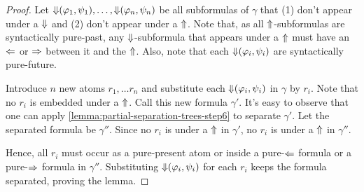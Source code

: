 \documentclass[a4paper,UKenglish,cleveref, autoref, thm-restate, numberwithinsect]{lipics-v2021}
\def\Larrow{\ensuremath\mathord{\Leftarrow}}
\def\Rarrow{\ensuremath\mathord{\Rightarrow}}
\def\Uarrow{\ensuremath\mathord{\Uparrow}}
\def\Darrow{\ensuremath\mathord{\Downarrow}}
\begin{document}
\begin{proof}
    Let $\Darrow(\varphi_1, \psi_1), \ldots, \Darrow(\varphi_n, \psi_n)$ be all subformulas of $\gamma$ that (1) don't appear under a $\Darrow$ and (2) don't appear under a $\Uarrow$. Note that, as all $\Uarrow$-subformulas are syntactically pure-past, any $\Darrow$-subformula that appears under a $\Uarrow$ must have an $\Larrow$ or $\Rarrow$ between it and the $\Uarrow$. Also, note that each $\Darrow(\varphi_i, \psi_i)$ are syntactically pure-future. %

    Introduce $n$ new atoms $r_1, \ldots r_n$ and substitute each $\Darrow(\varphi_i, \psi_i)$ in $\gamma$ by $r_i$. Note that no $r_i$ is embedded under a $\Uarrow$. Call this new formula $\gamma'$. It's easy to observe that one can apply \cref{lemma:partial-separation-trees-step6} to separate $\gamma'$. Let the separated formula be $\gamma''$. Since no $r_i$ is under a $\Uarrow$ in $\gamma'$, no $r_i$ is under a $\Uarrow$ in $\gamma''$.

    Hence, all $r_i$ must occur as a pure-present atom or inside a pure-$\Larrow$ formula or a pure-$\Rarrow$ formula in $\gamma''$. Substituting $\Darrow(\varphi_i, \psi_i)$ for each $r_i$ keeps the formula separated, proving the lemma.
\end{proof}
\end{document}
